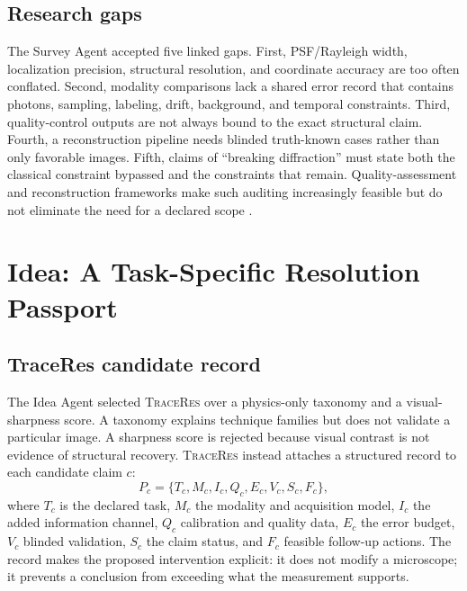 \documentclass[conference]{IEEEtran}
\newcommand{\traceres}{\textsc{TraceRes}}
\begin{document}
\subsection{Research gaps}

The Survey Agent accepted five linked gaps. First, PSF/Rayleigh width, localization precision, structural resolution, and coordinate accuracy are too often conflated. Second, modality comparisons lack a shared error record that contains photons, sampling, labeling, drift, background, and temporal constraints. Third, quality-control outputs are not always bound to the exact structural claim. Fourth, a reconstruction pipeline needs blinded truth-known cases rather than only favorable images. Fifth, claims of ``breaking diffraction'' must state both the classical constraint bypassed and the constraints that remain. Quality-assessment and reconstruction frameworks make such auditing increasingly feasible but do not eliminate the need for a declared scope \cite{laine2019,gustafsson2016}.

\section{Idea: A Task-Specific Resolution Passport}

\subsection{TraceRes candidate record}

The Idea Agent selected \traceres{} over a physics-only taxonomy and a visual-sharpness score. A taxonomy explains technique families but does not validate a particular image. A sharpness score is rejected because visual contrast is not evidence of structural recovery. \traceres{} instead attaches a structured record to each candidate claim \(c\):
\begin{equation}
 P_c=\{T_c,M_c,I_c,Q_c,E_c,V_c,S_c,F_c\},
\label{eq:passport}
\end{equation}
where \(T_c\) is the declared task, \(M_c\) the modality and acquisition model, \(I_c\) the added information channel, \(Q_c\) calibration and quality data, \(E_c\) the error budget, \(V_c\) blinded validation, \(S_c\) the claim status, and \(F_c\) feasible follow-up actions. The record makes the proposed intervention explicit: it does not modify a microscope; it prevents a conclusion from exceeding what the measurement supports.
\end{document}
